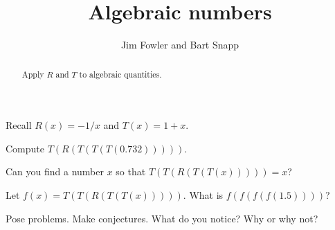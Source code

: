 \documentclass{ximera}
\title{Algebraic numbers}
\author{Jim Fowler and Bart Snapp}
\begin{document}
\begin{abstract}
  Apply $R$ and $T$ to algebraic quantities.
\end{abstract}

\maketitle

Recall $R(x) = -1/x$ and $T(x) = 1+x$.   

\begin{question}
  Compute $T(R(T(T(T(0.732)))))$.

  \begin{freeResponse}
  \end{freeResponse}
\end{question}

\begin{question}
  Can you find a number $x$ so that $T(T(R(T(T(x))))) = x$?

  \begin{freeResponse}
  \end{freeResponse}
\end{question}

\begin{question}
  Let $f(x) = T(T(R(T(T(x)))))$.  What is $f(f(f(f(1.5))))$?
  
  \begin{freeResponse}
  \end{freeResponse}
\end{question}

\begin{question}
  Pose problems.  Make conjectures.  What do you notice?  Why or why not?

  \begin{freeResponse}
  \end{freeResponse}
\end{question}
\end{document}
